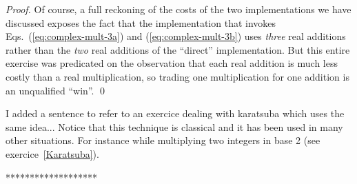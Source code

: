 {\begin{proof}
Of course, a full reckoning of the costs of the two implementations we
have discussed exposes the fact that the implementation that invokes
Eqs.~(\ref{eq:complex-mult-3a}) and (\ref{eq:complex-mult-3b}) uses {\em
  three} real additions rather than the {\em two} real additions of
the ``direct'' implementation.  But this entire exercise was
predicated on the observation that each real addition is much less
costly than a real multiplication, so trading one multiplication for
one addition is an unqualified ``win''.  \qed
\end{proof}

{\Denis I added a sentence to refer to an exercice dealing with karatsuba which uses the same idea...}
Notice that this technique is classical and it has been used in many other situations.
For instance while multiplying two integers in base 2 (see exercice~\ref{Karatsuba}).

*******************}

